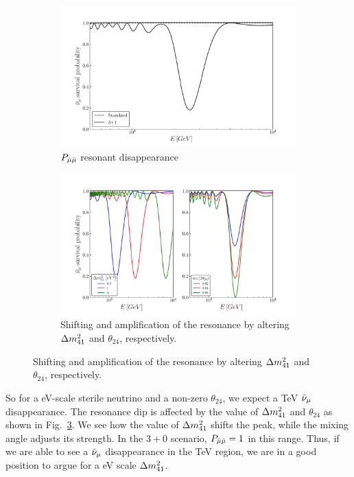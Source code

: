 \begin{figure}
    \centering
    \begin{subfigure}{0.35\textwidth}
        \includegraphics[width=1\linewidth]{figures/sterile_resonance.pdf}
        \caption{$P_{\bar{\mu} \bar{\mu}}$ resonant disappearance}\label{fig:sterile_resonance}
    \end{subfigure}
    \begin{subfigure}{0.69\textwidth}
        \includegraphics[width=1\linewidth]{figures/resonance_shift.pdf}
        \caption{Shifting and amplification of the resonance by altering $\dm[41]$ and $\theta_{24}$, respectively.}\label{fig:resonance_shift}
    \end{subfigure}
\end{figure}

So for a \si{\eV}-scale sterile neutrino and a non-zero $\theta_{24}$, we expect a \si{\TeV} $\bar{\nu}_\mu$ disappearance.
The resonance dip is affected by the value of $\dm[41]$ and $\theta_{24}$ as shown in Fig.~\ref{fig:resonance_shift}.
We see how the value of $\dm[41]$ shifts the peak, while the mixing angle adjusts its strength. 
In the $3+0$ scenario, $P_{\bar{\mu} \bar{\mu}} = 1$ in this range. Thus, if we are able to see a $\bar{\nu}_\mu$ disappearance in the \si{\TeV} region,
we are in a good position to argue for a \si{\eV} scale $\dm[41]$.


